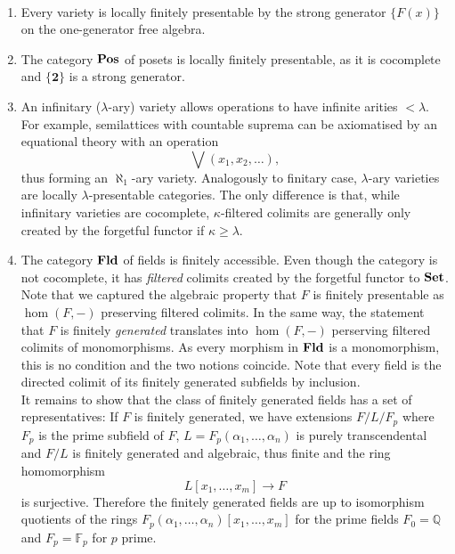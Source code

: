 \begin{Example}\
\begin{enumerate}
\item Every variety is locally finitely presentable by the strong generator $\{ F(x) \}$ on the one-generator free algebra.

\item The category $\mathbf{Pos}$ of posets is locally finitely presentable, as it is cocomplete and $\{\mathbf 2\}$ is a strong generator. 

\item An infinitary ($\lambda$-ary) variety allows operations to have infinite arities $< \lambda$. For example, semilattices with countable suprema can be axiomatised by an equational theory with an operation
\[ \bigvee(x_1, x_2, \ldots), \]
thus forming an $\aleph_1$-ary variety. Analogously to finitary case, $\lambda$-ary varieties are locally $\lambda$-presentable categories. The only difference is that, while infinitary varieties are cocomplete, $\kappa$-filtered colimits are generally only created by the forgetful functor if $\kappa \geq \lambda$.

\item The category $\mathbf{Fld}$ of fields is finitely accessible. Even though the category is not cocomplete, it has \emph{filtered} colimits created by the forgetful functor to $\mathbf{Set}$. \\

Note that we captured the algebraic property that $F$ is finitely presentable as $\hom(F,-)$ preserving filtered colimits. In the same way, the statement that $F$ is finitely \emph{generated} translates into $\hom(F,-)$ perserving filtered colimits of monomorphisms. As every morphism in $\mathbf{Fld}$ is a monomorphism, this is no condition and the two notions coincide. Note that every field is the directed colimit of its finitely generated subfields by inclusion. \\

It remains to show that the class of finitely generated fields has a set of representatives: If $F$ is finitely generated, we have extensions $F/L/F_p$ where $F_p$ is the prime subfield of $F$, $L=F_p(\alpha_1,\ldots,\alpha_n)$ is purely transcendental and $F/L$ is finitely generated and algebraic, thus finite and the ring homomorphism
\[ L[x_1,\ldots,x_m] \to F \]
is surjective. Therefore the finitely generated fields are up to isomorphism quotients of the rings $F_p(\alpha_1, \ldots,\alpha_n)[x_1,\ldots,x_m]$ for the prime fields $F_0 = \mathbb Q$ and $F_p = \mathbb F_p$ for $p$ prime.
\end{enumerate}
\end{Example}

